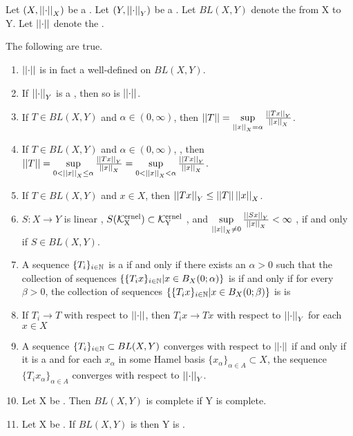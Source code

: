 \begin{prop}
\label{prop:BLO} 
Let $(X,\left|\left| \cdot \right|\right|_X)$ be a \SeminormedSpace. 
Let $(Y, \left|\left| \cdot \right|\right|_Y)$ be a \SeminormedSpace.
Let $BL(X,Y)$ denote the \SpaceOfBoundedLinearOperators from X to Y. 
Let $\left|\left| \cdot \right|\right|$ denote the \OperatorSeminorm. 

The following are true. 
\begin{enumerate}
\item $\left|\left| \cdot \right|\right|$ is in fact a well-defined \Seminorm on $BL(X,Y)$. 
\item If $\left|\left| \cdot \right|\right|_Y$ is a \Norm, then so is $\left|\left| \cdot \right|\right|$. 
\item If $T \in BL(X,Y)$ and $\alpha \in (0,\infty)$, then $\left|\left| T \right|\right| = \sup\limits_{\left|\left| x \right|\right|_X =\alpha} \frac{\left|\left| Tx \right|\right|_Y}{\left|\left| x \right|\right|_X}$. 
\item If $T \in BL(X,Y)$ and $\alpha \in (0,\infty)$, , then $\left|\left| T \right|\right| = \sup\limits_{0<\left|\left| x \right|\right|_X \leq \alpha} \frac{\left|\left| Tx \right|\right|_Y}{\left|\left| x \right|\right|_X}= \sup\limits_{0<\left|\left| x \right|\right|_X < \alpha} \frac{\left|\left| Tx \right|\right|_Y}{\left|\left| x \right|\right|_X}$. 
\item If $T \in BL(X,Y)$ and $x \in X$, then $\left|\left| Tx \right|\right|_Y \leq \left|\left| T \right|\right| \left|\left| x \right|\right|_X$. 
\item $S:X \to Y$ is linear
, $S(\bf\mathcal{K}\rm^{ernel}_X) \subset \bf\mathcal{K}\rm^{ernel}_Y$
, and $\sup\limits_{\left|\left| x \right|\right|_X \neq 0} \frac{\left|\left| Sx \right|\right|_Y}{\left|\left| x \right|\right|_X} < \infty$
, if and only if $S \in BL(X,Y)$. 
\item A sequence $\{T_i\}_{i \in \mathbb{N}}$ is a \PseudometricCauchySequence
    if and only if
    there exists an $\alpha > 0$ 
    such that the collection of sequences 
    $\{\{T_ix\}_{i \in \mathbb{N}} | x \in B_X(0;\alpha)\}$ is
    \UniformlyCauchy
    if and only if
    for every $\beta > 0$, 
    the collection of sequences 
    $\{\{T_ix\}_{i \in \mathbb{N}} | x \in B_X(0;\beta)\}$ is
    is \UniformlyCauchy
\item If $T_i \to T$ with respect to $\left|\left| \cdot \right|\right|$, then $T_ix \to Tx$ with respect to $\left|\left| \cdot \right|\right|_Y$ for each $x \in X$
\item A sequence $\{T_i\}_{i \in \mathbb{N}} \subset BL(X,Y)$ 
    converges %
    with respect to $\left|\left| \cdot \right|\right|$ 
    if and only if it is a \PseudometricCauchySequence 
    and for each $x_\alpha$ 
    in some Hamel basis $\{x_\alpha\}_{\alpha \in A} \subset X$,
    the sequence $\{T_ix_\alpha\}_{\alpha \in A}$
    converges with respect to $\left|\left| \cdot \right|\right|_Y$. 
\item Let X be \NonDegenerate. Then $BL(X,Y)$ is complete if Y is complete. 
\item Let X be \NonDegenerate. If $BL(X,Y)$ is \NonDegenerate then Y is \NonDegenerate.
\end{enumerate}



\end{prop}
